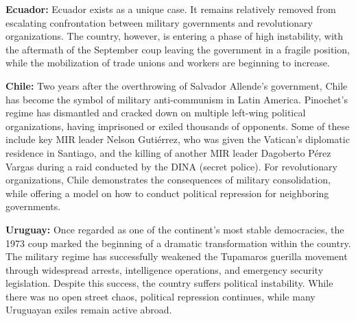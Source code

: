\textbf{Ecuador:} Ecuador exists as a unique case. It remains relatively removed from escalating confrontation between military governments and revolutionary organizations. The country, however, is entering a phase of high instability, with the aftermath of the September coup leaving the government in a fragile position, while the mobilization of trade unions and workers are beginning to increase.

\textbf{Chile:} Two years after the overthrowing of Salvador Allende’s government, Chile has become the symbol of military anti-communism in Latin America. Pinochet’s regime has dismantled and cracked down on multiple left-wing political organizations, having imprisoned or exiled thousands of opponents. Some of these include key MIR leader Nelson Gutiérrez, who was given the Vatican's diplomatic residence in Santiago, and the killing of another MIR leader Dagoberto Pérez Vargas during a raid conducted by the DINA (secret police). For revolutionary organizations, Chile demonstrates the consequences of military consolidation, while offering a model on how to conduct political repression for neighboring governments.

\textbf{Uruguay:} Once regarded as one of the continent’s most stable democracies, the 1973 coup marked the beginning of a dramatic transformation within the country. The military regime has successfully weakened the Tupamaros guerilla movement through widespread arrests, intelligence operations, and emergency security legislation. Despite this success, the country suffers political instability. While there was no open street chaos, political repression continues, while many Uruguayan exiles remain active abroad.
